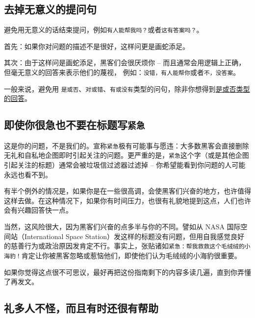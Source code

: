 \documentclass[titlepage]{article}
\begin{document}
\hypertarget{ux53bbux6389ux65e0ux610fux4e49ux7684ux63d0ux95eeux53e5}{\subsection{去掉无意义的提问句}\label{ux53bbux6389ux65e0ux610fux4e49ux7684ux63d0ux95eeux53e5}}

避免用无意义的话结束提问，例如\texttt{有人能帮我吗？}或者\texttt{这有答案吗？}。

首先：如果你对问题的描述不是很好，这样问更是画蛇添足。

其次：由于这样问是画蛇添足，黑客们会很厌烦你 --
而且通常会用逻辑上正确，但毫无意义的回答来表示他们的蔑视，
例如：\texttt{没错，有人能帮你}或者\texttt{不，没答案}。

一般来说，避免用
\texttt{是或否}、\texttt{对或错}、\texttt{有或没有}类型的问句，除非你想得到\href{http://homepage.ntlworld.com./jonathan.deboynepollard/FGA/questions-with-yes-or-no-answers.html}{是或否类型的回答}。

\hypertarget{ux5373ux4f7fux4f60ux5f88ux6025ux4e5fux4e0dux8981ux5728ux6807ux9898ux5199ux7d27ux6025}{\subsection{\texorpdfstring{即使你很急也不要在标题写\texttt{紧急}}{即使你很急也不要在标题写紧急}}\label{ux5373ux4f7fux4f60ux5f88ux6025ux4e5fux4e0dux8981ux5728ux6807ux9898ux5199ux7d27ux6025}}

这是你的问题，不是我们的。宣称\texttt{紧急}极有可能事与愿违：大多数黑客会直接删除无礼和自私地企图即时引起关注的问题。更严重的是，\texttt{紧急}这个字（或是其他企图引起关注的标题）通常会被垃圾信过滤器过滤掉
-- 你希望能看到你问题的人可能永远也看不到。

有半个例外的情况是，如果你是在一些很高调，会使黑客们兴奋的地方，也许值得这样去做。在这种情况下，如果你有时间压力，也很有礼貌地提到这点，人们也许会有兴趣回答快一点。

当然，这风险很大，因为黑客们兴奋的点多半与你的不同。譬如从 NASA
国际空间站（International Space
Station）发这样的标题没有问题，但用自我感觉良好的慈善行为或政治原因发肯定不行。事实上，张贴诸如\texttt{紧急：帮我救救这个毛绒绒的小海豹！}肯定让你被黑客忽略或惹恼他们，即使他们认为毛绒绒的小海豹很重要。

如果你觉得这点很不可思议，最好再把这份指南剩下的内容多读几遍，直到你弄懂了再发文。

\hypertarget{ux793cux591aux4ebaux4e0dux602aux800cux4e14ux6709ux65f6ux8fd8ux5f88ux6709ux5e2eux52a9}{\subsection{礼多人不怪，而且有时还很有帮助}\label{ux793cux591aux4ebaux4e0dux602aux800cux4e14ux6709ux65f6ux8fd8ux5f88ux6709ux5e2eux52a9}}
\end{document}
